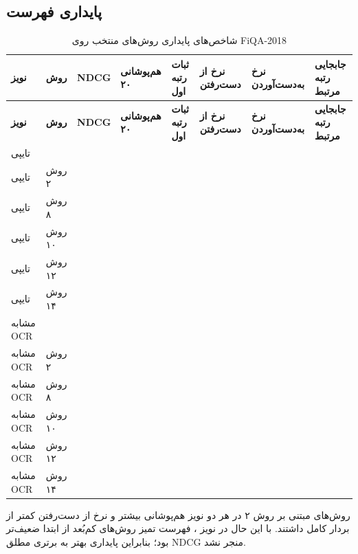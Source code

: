\documentclass[a4paper,12pt]{article}
\begin{document}
\subsection{پایداری فهرست}
\begin{landscape}
\scriptsize
\begin{longtable}{|C{2cm}|C{2.3cm}|C{1.7cm}|C{2.2cm}|C{2.2cm}|C{2.2cm}|C{2.2cm}|C{2.5cm}|}
\caption{شاخص‌های پایداری روش‌های منتخب روی FiQA-2018}\label{tab:fiqa-robust}\\
\hline
\textbf{نویز} & \textbf{روش} & \textbf{NDCG} & \textbf{هم‌پوشانی ۲۰} & \textbf{ثبات رتبه اول} & \textbf{نرخ از دست‌رفتن} & \textbf{نرخ به‌دست‌آوردن} & \textbf{جابجایی رتبه مرتبط} \\
\hline
\endfirsthead
\hline
\textbf{نویز} & \textbf{روش} & \textbf{NDCG} & \textbf{هم‌پوشانی ۲۰} & \textbf{ثبات رتبه اول} & \textbf{نرخ از دست‌رفتن} & \textbf{نرخ به‌دست‌آوردن} & \textbf{جابجایی رتبه مرتبط} \\
\hline
\endhead
تایپی &  &  &  &  &  &  &  \\
\hline
تایپی & روش ۲ &  &  &  &  &  &  \\
\hline
تایپی & روش ۸ &  &  &  &  &  &  \\
\hline
تایپی & روش ۱۰ &  &  &  &  &  &  \\
\hline
تایپی & روش ۱۲ &  &  &  &  &  &  \\
\hline
تایپی & روش ۱۴ &  &  &  &  &  &  \\
\hline
مشابه OCR &  &  &  &  &  &  &  \\
\hline
مشابه OCR & روش ۲ &  &  &  &  &  &  \\
\hline
مشابه OCR & روش ۸ &  &  &  &  &  &  \\
\hline
مشابه OCR & روش ۱۰ &  &  &  &  &  &  \\
\hline
مشابه OCR & روش ۱۲ &  &  &  &  &  &  \\
\hline
مشابه OCR & روش ۱۴ &  &  &  &  &  &  \\
\hline
\end{longtable}
\end{landscape}
روش‌های مبتنی بر روش ۲ در هر دو نویز هم‌پوشانی بیشتر و نرخ از دست‌رفتن کمتر از بردار کامل داشتند. با این حال در نویز ، فهرست تمیز روش‌های کم‌بُعد از ابتدا ضعیف‌تر بود؛ بنابراین پایداری بهتر به برتری مطلق NDCG منجر نشد.
\end{document}
